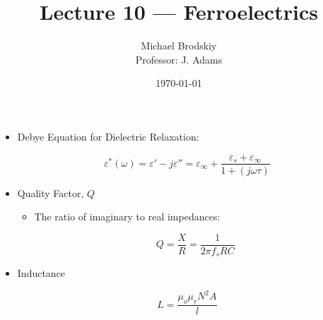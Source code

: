 


\title{Lecture 10 — Ferroelectrics}
\date{\today}
\author{Michael Brodskiy\\ \small Professor: J. Adams}



\maketitle

\begin{itemize}

  \item Debye Equation for Dielectric Relaxation:

    $$\varepsilon^*(\omega)=\varepsilon'-j\varepsilon''=\varepsilon_{\infty}+\frac{\varepsilon_s+\varepsilon_{\infty}}{1+(j\omega\tau)}$$

  \item Quality Factor, $Q$

    \begin{itemize}

      \item The ratio of imaginary to real impedances:

        $$Q=\frac{X}{R}=\frac{1}{2\pi f_s RC}$$

    \end{itemize}

  \item Inductance

    $$L=\frac{\mu_o\mu_rN^2A}{l}$$

\end{itemize}



